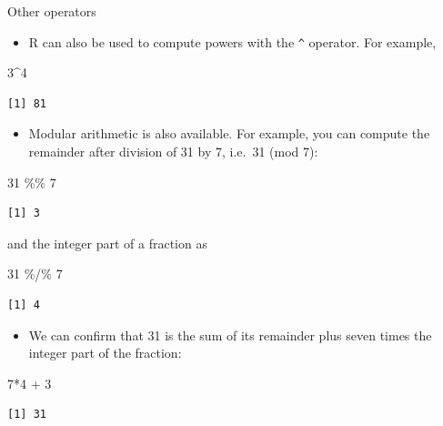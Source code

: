 \documentclass[
  9pt,
  a4paper,
  ignorenonframetext,
  notheorems]{beamer}
\newenvironment{Shaded}{\begin{snugshade}}{\end{snugshade}}
\newcommand{\DecValTok}[1]{\textcolor[rgb]{0.68,0.00,0.00}{#1}}
\newcommand{\SpecialCharTok}[1]{\textcolor[rgb]{0.37,0.37,0.37}{#1}}
\providecommand{\tightlist}{%
  \setlength{\itemsep}{0pt}\setlength{\parskip}{0pt}}\usepackage{longtable,booktabs,array}
\begin{document}
\begin{frame}[fragile]
\begin{block}{Other operators}
\protect\hypertarget{other-operators}{}
\begin{itemize}
\tightlist
\item
  R can also be used to compute powers with the \texttt{\^{}} operator.
  For example,
\end{itemize}

\begin{Shaded}
\begin{Highlighting}[]
\DecValTok{3}\SpecialCharTok{\^{}}\DecValTok{4}
\end{Highlighting}
\end{Shaded}

\begin{verbatim}
[1] 81
\end{verbatim}

\begin{itemize}
\tightlist
\item
  Modular arithmetic is also available. For example, you can compute the
  remainder after division of 31 by 7, i.e.~31 (mod 7):
\end{itemize}

\begin{Shaded}
\begin{Highlighting}[]
\DecValTok{31} \SpecialCharTok{\%\%} \DecValTok{7}
\end{Highlighting}
\end{Shaded}

\begin{verbatim}
[1] 3
\end{verbatim}

and the integer part of a fraction as

\begin{Shaded}
\begin{Highlighting}[]
\DecValTok{31} \SpecialCharTok{\%/\%} \DecValTok{7}
\end{Highlighting}
\end{Shaded}

\begin{verbatim}
[1] 4
\end{verbatim}

\begin{itemize}
\tightlist
\item
  We can confirm that 31 is the sum of its remainder plus seven times
  the integer part of the fraction:
\end{itemize}

\begin{Shaded}
\begin{Highlighting}[]
\DecValTok{7}\SpecialCharTok{*}\DecValTok{4} \SpecialCharTok{+} \DecValTok{3}
\end{Highlighting}
\end{Shaded}

\begin{verbatim}
[1] 31
\end{verbatim}
\end{block}
\end{frame}
\end{document}
